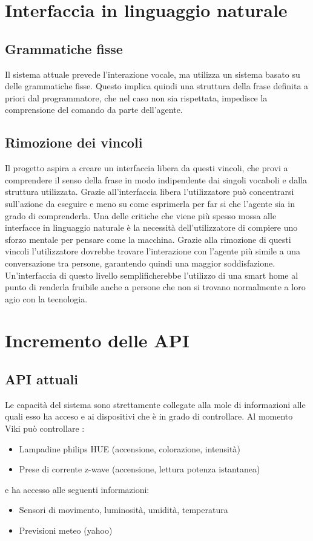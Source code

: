 \documentclass[twoside]{supsistudent}
\begin{document}
\section{Interfaccia in linguaggio naturale}
\subsection{Grammatiche fisse}
Il sistema attuale prevede l'interazione vocale, ma utilizza un sistema basato su delle grammatiche fisse. Questo implica quindi una struttura della frase definita a priori dal programmatore, che nel caso non sia rispettata, impedisce la comprensione del comando da parte dell'agente.
\subsection{Rimozione dei vincoli}
Il progetto aspira a creare un interfaccia libera da questi vincoli, che provi a comprendere il senso della frase in modo indipendente dai singoli vocaboli e dalla struttura utilizzata.
Grazie all'interfaccia libera l'utilizzatore può concentrarsi sull'azione da eseguire e meno su come esprimerla per far si che l'agente sia in grado di comprenderla. Una delle critiche che viene più spesso mossa alle interfacce in linguaggio naturale è la necessità dell'utilizzatore di compiere uno sforzo mentale per pensare come la macchina.
Grazie alla rimozione di questi vincoli l'utilizzatore dovrebbe trovare l'interazione con l'agente più simile a una conversazione tra persone, garantendo quindi una maggior soddisfazione.
Un'interfaccia di questo livello semplificherebbe l'utilizzo di una smart home al punto di renderla fruibile anche a persone che non si trovano normalmente a loro agio con la tecnologia.
\section{Incremento delle API}
\subsection{API attuali}
Le capacità del sistema sono strettamente collegate alla mole di informazioni alle quali esso ha acceso e ai dispositivi che è in grado di controllare. 
Al momento Viki può controllare :
\begin{itemize}
  \item Lampadine philips HUE (accensione, colorazione, intensità)
  \item Prese di corrente z-wave (accensione, lettura potenza istantanea)
\end{itemize}
e ha accesso alle seguenti informazioni:
\begin{itemize}
  \item Sensori di movimento, luminosità, umidità, temperatura
  \item Previsioni meteo (yahoo)
\end{itemize}
\end{document}
